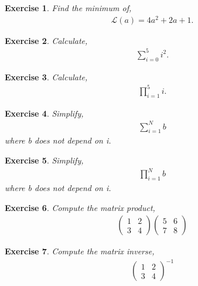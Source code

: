 \documentclass{article}
\renewcommand{\L}{\mathcal{L}}
\newtheorem{exercise}{Exercise}
\begin{document}
\begin{exercise}
  Find the minimum of,
  \begin{align}
    \L(a) = 4 a^2 + 2 a + 1.
  \end{align}
\end{exercise}

\begin{exercise}
  Calculate,
  \begin{align}
    \sum_{i=0}^5 i^2.
  \end{align}
\end{exercise}

\begin{exercise}
  Calculate,
  \begin{align}
    \prod_{i=1}^5 i.
  \end{align}
\end{exercise}

\begin{exercise}
  Simplify,
  \begin{align}
    \sum_{i=1}^N b
  \end{align}
  where b does not depend on i.
\end{exercise}

\begin{exercise}
  Simplify,
  \begin{align}
    \prod_{i=1}^N b
  \end{align}
  where b does not depend on i.
\end{exercise}

\begin{exercise}
  Compute the matrix product,
  \begin{align}
    \begin{pmatrix}
      1 & 2 \\
      3 & 4
    \end{pmatrix}
    \begin{pmatrix}
      5 & 6 \\
      7 & 8
    \end{pmatrix}
  \end{align}
\end{exercise}

\begin{exercise}
  Compute the matrix inverse,
  \begin{align}
    \begin{pmatrix}
      1 & 2 \\
      3 & 4
    \end{pmatrix}^{-1}
  \end{align}
\end{exercise}
\end{document}
